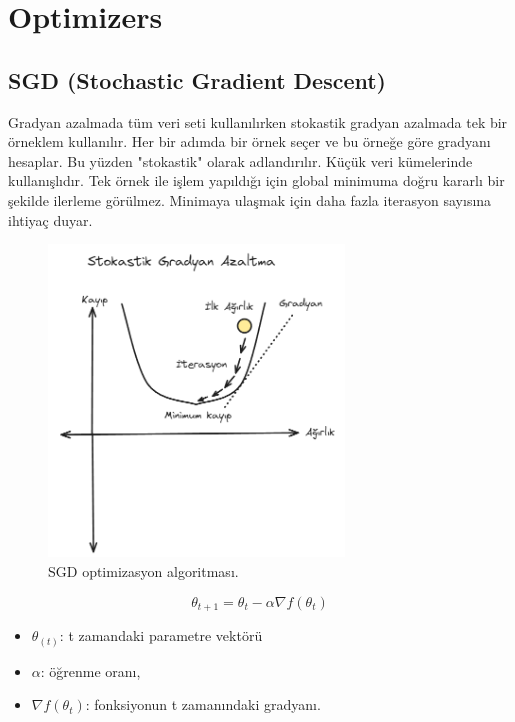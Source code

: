 \section{Optimizers}

\subsection{SGD (Stochastic Gradient Descent)}
Gradyan azalmada tüm veri seti kullanılırken stokastik gradyan azalmada tek bir örneklem kullanılır. Her bir adımda bir örnek seçer ve bu örneğe göre gradyanı hesaplar. Bu yüzden "stokastik" olarak adlandırılır. Küçük veri kümelerinde kullanışlıdır. Tek örnek ile işlem yapıldığı için global minimuma doğru kararlı bir şekilde ilerleme görülmez. Minimaya ulaşmak için daha fazla iterasyon sayısına ihtiyaç duyar.

\begin{figure}[h]
    \centering
    \includegraphics[width=0.7\textwidth]{images/sgd_optimizer.png}
    \caption{SGD optimizasyon algoritması.}
    \label{fig:enter-label}
\end{figure}


\[\theta_{t+1} = \theta_{t} - \alpha \nabla f(\theta_{t})\]
\begin{itemize}
	\item $\theta_(t)$: t zamandaki parametre vektörü
	\item $\alpha$: öğrenme oranı,
	\item $\nabla f(\theta_{t})$: fonksiyonun t zamanındaki gradyanı.
\end{itemize}

\newpage

